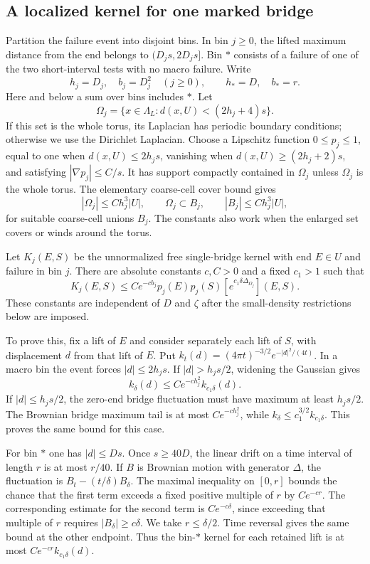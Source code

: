 \subsection{A localized kernel for one marked bridge}

Partition the failure event into disjoint bins.  In bin $j\ge0$, the
lifted maximum distance from the end belongs to $(D_js,2D_js]$.  Bin
$*$ consists of a failure of one of the two short-interval tests with
no macro failure.  Write
\[
 h_j=D_j,\quad b_j=D_j^2\quad(j\ge0),
 \qquad h_*=D,\quad b_*=r.
\]
Here and below a sum over bins includes $*$.  Let
\[
 \Omega_j=\{x\in\Lambda_L:d(x,U)<(2h_j+4)s\}.
\]
If this set is the whole torus, its Laplacian has periodic boundary
conditions; otherwise we use the Dirichlet Laplacian.  Choose a
Lipschitz function $0\le p_j\le1$, equal to one when $d(x,U)\le2h_js$,
vanishing when $d(x,U)\ge(2h_j+2)s$, and satisfying
$|\nabla p_j|\le C/s$.  It has support compactly contained in $\Omega_j$
unless $\Omega_j$ is the whole torus.  The elementary coarse-cell cover
bound gives
\[
 |\Omega_j|\le C h_j^3|U|,
 \qquad
 \Omega_j\subset B_j,\qquad |B_j|\le C h_j^3|U|,
\]
for suitable coarse-cell unions $B_j$.  The constants also work when
the enlarged set covers or winds around the torus.

Let $K_j(E,S)$ be the unnormalized free single-bridge kernel with end
$E\in U$ and failure in bin $j$.  There are absolute constants $c,C>0$
and a fixed $c_1>1$ such that
\begin{equation}
 K_j(E,S)
 \le C e^{-cb_j}p_j(E)p_j(S)
          [e^{c_1\delta\Delta_{\Omega_j}}](E,S).
 \tag{18}\label{eq:18}
\end{equation}
These constants are independent of $D$ and $\zeta$ after the
small-density restrictions below are imposed.

To prove this, fix a lift of $E$ and consider separately each lift of
$S$, with displacement $d$ from that lift of $E$.  Put
$k_t(d)=(4\pi t)^{-3/2}e^{-|d|^2/(4t)}$.  In a macro bin the event
forces $|d|\le2h_js$.  If $|d|>h_js/2$, widening the Gaussian gives
\[
 k_\delta(d)\le C e^{-ch_j^2}k_{c_1\delta}(d).
\]
If $|d|\le h_js/2$, the zero-end bridge fluctuation must have maximum
at least $h_js/2$.  The Brownian bridge maximum tail is at most
$Ce^{-ch_j^2}$, while $k_\delta\le c_1^{3/2}k_{c_1\delta}$.
This proves the same bound for this case.

For bin $*$ one has $|d|\le Ds$.  Once $s\ge40D$, the linear drift
on a time interval of length $r$ is at most $r/40$.  If $B$ is
Brownian motion with generator $\Delta$, the fluctuation is
$B_t-(t/\delta)B_\delta$.  The maximal inequality on $[0,r]$ bounds
the chance that the first term exceeds a fixed positive multiple
of $r$ by $Ce^{-cr}$.  The corresponding estimate for the second
term is $Ce^{-c\delta}$, since exceeding that multiple of $r$
requires $|B_\delta|\ge c\delta$.  We take $r\le\delta/2$.
Time reversal gives the same bound at the other endpoint.  Thus
the bin-$*$ kernel for each retained lift is at most
$Ce^{-cr}k_{c_1\delta}(d)$.

